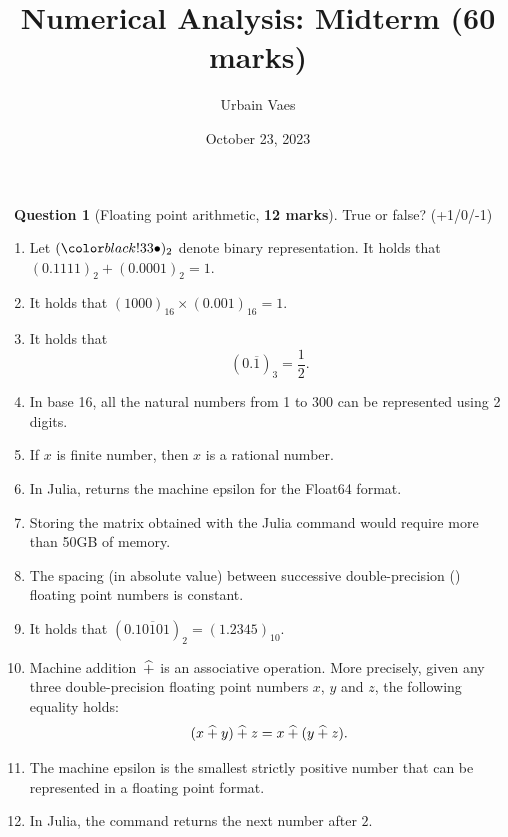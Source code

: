 \documentclass[11pt]{article}
\theoremstyle{definition}
\newtheorem{question}{{\normalfont \faGears}~Question}
\renewcommand{\mymarks}[1]{\textbf{#1 marks}}
\begin{document}
\title{Numerical Analysis: Midterm {\small (\mymarks{60})}}
\author{Urbain Vaes}
\date{October 23, 2023}
\maketitle

\begin{question}
    [Floating point arithmetic, \mymarks{12}]
    True or false? (+1/0/-1)
    \begin{enumerate}
        \item Let $(\placeholder)_2$ denote binary representation.
            It holds that
            \(
                (0.1111)_2 + (0.0001)_2 = 1.
            \)
        \item It holds that
            \(
                (1000)_{16} \times (0.001)_{16} = 1.
            \)
        \item It holds that
            \[
                (0.\overline{1})_3 = \frac{1}{2}.
            \]

        \item
            In base 16, all the natural numbers from 1 to 300 can be represented using 2 digits.

        \item
            If $x$ is finite  number,
            then $x$ is a rational number.

        \item
            In Julia,  returns the machine epsilon for the Float64 format.

        \item
            Storing the matrix obtained with the Julia command  would require more than 50GB of memory.

        \item
            The spacing (in absolute value) between successive double-precision () floating point numbers is constant.

        \item
            It holds that $(0.\overline{10101})_2 = (1.2345)_{10}$.

        \item Machine addition~$\mathbin{\widehat +}$ is an associative operation.
            More precisely, given any three double-precision floating point numbers $x$, $y$ and $z$,
            the following equality holds:
            \[
                (x \mathbin{\widehat +} y) \mathbin{\widehat +} z = x \mathbin{\widehat +} (y \mathbin{\widehat +} z).
            \]
        \item
            The machine epsilon is the smallest strictly positive number that can be represented in a floating point format.

        \item
            In Julia, the command  returns
            the next  number after $2$.
    \end{enumerate}
\end{question}
\end{document}
